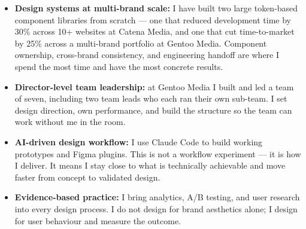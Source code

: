 \documentclass[]{cover-fira}
\begin{document}


\currentdate{\today}



{\raggedright{}\fontsize{11pt}{13pt}\selectfont
\begin{itemize}
    \item \textbf{Design systems at multi-brand scale:} I have built two large token-based component libraries from scratch — one that reduced development time by 30\% across 10+ websites at Catena Media, and one that cut time-to-market by 25\% across a multi-brand portfolio at Gentoo Media. Component ownership, cross-brand consistency, and engineering handoff are where I spend the most time and have the most concrete results.
    \item \textbf{Director-level team leadership:} at Gentoo Media I built and led a team of seven, including two team leads who each ran their own sub-team. I set design direction, own performance, and build the structure so the team can work without me in the room.
    \item \textbf{AI-driven design workflow:} I use Claude Code to build working prototypes and Figma plugins. This is not a workflow experiment — it is how I deliver. It means I stay close to what is technically achievable and move faster from concept to validated design.
    \item \textbf{Evidence-based practice:} I bring analytics, A/B testing, and user research into every design process. I do not design for brand aesthetics alone; I design for user behaviour and measure the outcome.
\end{itemize}\par}
\vspace{6pt}
\end{document}
